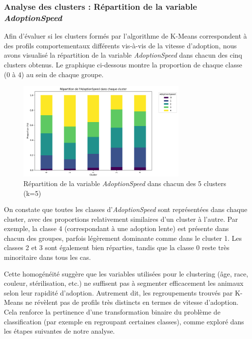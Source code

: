 \documentclass[a4paper,12pt]{article}
\begin{document}
\subsubsection{Analyse des clusters : Répartition de la variable \textit{AdoptionSpeed}}

Afin d’évaluer si les clusters formés par l’algorithme de K-Means correspondent à des profils comportementaux différents vis-à-vis de la vitesse d’adoption, nous avons visualisé la répartition de la variable \textit{AdoptionSpeed} dans chacun des cinq clusters obtenus. Le graphique ci-dessous montre la proportion de chaque classe (0 à 4) au sein de chaque groupe.

\begin{figure}[H]
    \centering
    \includegraphics[width=0.75\textwidth]{repartition_de_adoptionspeed.png}
    \caption{Répartition de la variable \textit{AdoptionSpeed} dans chacun des 5 clusters (k=5)}
    \label{fig:cluster_adoption_split}
\end{figure}

On constate que toutes les classes d’\textit{AdoptionSpeed} sont représentées dans chaque cluster, avec des proportions relativement similaires d’un cluster à l’autre. Par exemple, la classe 4 (correspondant à une adoption lente) est présente dans chacun des groupes, parfois légèrement dominante comme dans le cluster 1. Les classes 2 et 3 sont également bien réparties, tandis que la classe 0 reste très minoritaire dans tous les cas.

Cette homogénéité suggère que les variables utilisées pour le clustering (âge, race, couleur, stérilisation, etc.) ne suffisent pas à segmenter efficacement les animaux selon leur rapidité d’adoption. Autrement dit, les regroupements trouvés par K-Means ne révèlent pas de profils très distincts en termes de vitesse d’adoption. Cela renforce la pertinence d’une transformation binaire du problème de classification (par exemple en regroupant certaines classes), comme exploré dans les étapes suivantes de notre analyse.
\end{document}
